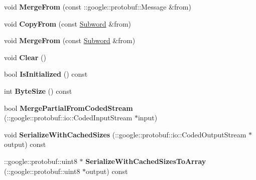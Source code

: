 \begin{DoxyCompactItemize}
\item 
\hypertarget{classlattice_1_1Subword_a9477c976f0289cea8423429c562b7d81}{
void {\bfseries MergeFrom} (const ::google::protobuf::Message \&from)}
\label{classlattice_1_1Subword_a9477c976f0289cea8423429c562b7d81}

\item 
\hypertarget{classlattice_1_1Subword_a433f5e66bd6cea31a3c63d0a74a95de4}{
void {\bfseries CopyFrom} (const \hyperlink{classlattice_1_1Subword}{Subword} \&from)}
\label{classlattice_1_1Subword_a433f5e66bd6cea31a3c63d0a74a95de4}

\item 
\hypertarget{classlattice_1_1Subword_af8f40895c8ae1ce04f617fedaa377192}{
void {\bfseries MergeFrom} (const \hyperlink{classlattice_1_1Subword}{Subword} \&from)}
\label{classlattice_1_1Subword_af8f40895c8ae1ce04f617fedaa377192}

\item 
\hypertarget{classlattice_1_1Subword_ab1072bac4c0bdeda3c448a40e89c9ed4}{
void {\bfseries Clear} ()}
\label{classlattice_1_1Subword_ab1072bac4c0bdeda3c448a40e89c9ed4}

\item 
\hypertarget{classlattice_1_1Subword_ae032c1b833fdfce330d0f185d3c08f97}{
bool {\bfseries IsInitialized} () const }
\label{classlattice_1_1Subword_ae032c1b833fdfce330d0f185d3c08f97}

\item 
\hypertarget{classlattice_1_1Subword_aa8d179aa2974c3c662c5790ca03148bd}{
int {\bfseries ByteSize} () const }
\label{classlattice_1_1Subword_aa8d179aa2974c3c662c5790ca03148bd}

\item 
\hypertarget{classlattice_1_1Subword_ade168b7ef9839ed60bc6a1fe33c6a5a2}{
bool {\bfseries MergePartialFromCodedStream} (::google::protobuf::io::CodedInputStream $\ast$input)}
\label{classlattice_1_1Subword_ade168b7ef9839ed60bc6a1fe33c6a5a2}

\item 
\hypertarget{classlattice_1_1Subword_ab8c9ea5fadefc35219ce39839adbf303}{
void {\bfseries SerializeWithCachedSizes} (::google::protobuf::io::CodedOutputStream $\ast$output) const }
\label{classlattice_1_1Subword_ab8c9ea5fadefc35219ce39839adbf303}

\item 
\hypertarget{classlattice_1_1Subword_a0d5952adf4aedfecbcd27f048e9cfbb6}{
::google::protobuf::uint8 $\ast$ {\bfseries SerializeWithCachedSizesToArray} (::google::protobuf::uint8 $\ast$output) const }
\label{classlattice_1_1Subword_a0d5952adf4aedfecbcd27f048e9cfbb6}


\end{DoxyCompactItemize}
